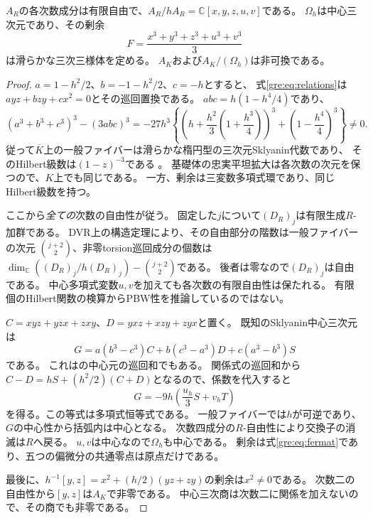 \begin{proposition}[主定理を適用できる非可換な三次三様体の族]
\label{gre:prop:input}
$A_R$の各次数成分は有限自由で、$A_R/hA_R=\mathbb C[x,y,z,u,v]$である。
$\Omega_h$は中心三次元であり、その剰余
\begin{equation}\label{gre:eq:fermat}
 F=\frac{x^3+y^3+z^3+u^3+v^3}{3}
\end{equation}
は滑らかな三次三様体を定める。
$A_K$および$A_K/(\Omega_h)$は非可換である。
\end{proposition}
\begin{proof}
$a=1-h^2/2$、$b=-1-h^2/2$、$c=-h$とすると、
式\eqref{gre:eq:relations}は$ayz+bzy+cx^2=0$とその巡回置換である。
$abc=h(1-h^4/4)$であり、
\begin{equation}\label{gre:eq:sklyanin-discriminant}
 (a^3+b^3+c^3)^3-(3abc)^3
 =-27h^3\left\{
 \left(h+\frac{h^2}{3}\left(1+\frac{h^3}{4}\right)\right)^3
 +\left(1-\frac{h^4}{4}\right)^3\right\}\ne0.
\end{equation}
従って$\overline K$上の一般ファイバーは滑らかな楕円型の三次元Sklyanin代数であり、
そのHilbert級数は$(1-z)^{-3}$である
\cite[Section~1, pp.~19--20]{GRSklyaninST}。
基礎体の忠実平坦拡大は各次数の次元を保つので、$K$上でも同じである。
一方、剰余は三変数多項式環であり、同じHilbert級数を持つ。

ここから\emph{全ての}次数の自由性が従う。
固定した$j$について$(D_R)_j$は有限生成$R$-加群である。
DVR上の構造定理により、その自由部分の階数は一般ファイバーの次元
$\binom{j+2}{2}$、非零torsion巡回成分の個数は
$\dim_{\mathbb C}((D_R)_j/h(D_R)_j)-\binom{j+2}{2}$である。
後者は零なので$(D_R)_j$は自由である。
中心多項式変数$u,v$を加えても各次数の有限自由性は保たれる。
有限個のHilbert関数の検算からPBW性を推論しているのではない。

$C=xyz+yzx+zxy$、$D=yxz+xzy+zyx$と置く。
既知のSklyanin中心三次元は
\begin{equation}\label{gre:eq:known-center}
 G=a(b^3-c^3)C+b(c^3-a^3)D+c(a^3-b^3)S
\end{equation}
である\cite[Section~2, p.~3]{GRSklyaninDLL}。
これは\cite[p.~35, Remark~(1)]{GRSklyaninST}の中心元の巡回和でもある。
関係式の巡回和から$C-D=hS+(h^2/2)(C+D)$となるので、係数を代入すると
\begin{equation}\label{gre:eq:center-identity}
 G=-9h\left(\frac{u_h}{3}S+v_hT\right)
\end{equation}
を得る。この等式は多項式恒等式である。
一般ファイバーでは$h$が可逆であり、$G$の中心性から括弧内は中心となる。
次数四成分の$R$-自由性により交換子の消滅は$R$へ戻る。
$u,v$は中心なので$\Omega_h$も中心である。
剰余は式\eqref{gre:eq:fermat}であり、五つの偏微分の共通零点は原点だけである。

最後に、$h^{-1}[y,z]=x^2+(h/2)(yz+zy)$の剰余は$x^2\ne0$である。
次数二の自由性から$[y,z]$は$A_K$で非零である。
中心三次商は次数二に関係を加えないので、その商でも非零である。
\end{proof}

